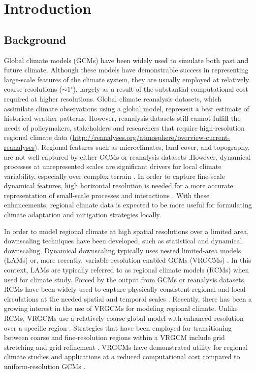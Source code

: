\chapter{Introduction}

\section{Background}

Global climate models (GCMs) have been widely used to simulate both past and future climate. Although these models have demonstrable success in representing large-scale features of the climate system, they are usually employed at relatively coarse resolutions ($\sim$1$^\circ$), largely as a result of the substantial computational cost required at higher resolutions. Global climate reanalysis datasets, which assimilate climate observations using a global model, represent a best estimate of historical weather patterns. However, reanalysis datasets still cannot fulfill the needs of policymakers, stakeholders and researchers that require high-resolution regional climate data (\url{http://reanalyses.org/atmosphere/overview-current-reanalyses}). Regional features such as microclimates, land cover, and topography, are not well captured by either GCMs or reanalysis datasets \cite{leung2003regional}.However, dynamical processes at unrepresented scales are significant drivers for local climate variability, especially over complex terrain \cite{soares2012wrf}. In order to capture fine-scale dynamical features, high horizontal resolution is needed for a more accurate representation of small-scale processes and interactions \cite{rauscher2010resolution}. With these enhancements, regional climate data is expected to be more useful for formulating climate adaptation and mitigation strategies locally.

In order to model regional climate at high spatial resolutions over a limited area, downscaling techniques have been developed, such as statistical and dynamical downscaling. Dynamical downscaling typically uses nested limited-area models (LAMs) or, more recently, variable-resolution enabled GCMs (VRGCMs) \cite{laprise2008regional}. In this context, LAMs are typically referred to as regional climate models (RCMs) when used for climate study. Forced by the output from GCMs or reanalysis datasets, RCMs have been widely used to capture physically consistent regional and local circulations at the needed spatial and temporal scales \cite{christensen2007regional, bukovsky2009precipitation, mearns2012north}. Recently, there has been a growing interest in the use of VRGCMs for modeling regional climate. Unlike RCMs, VRGCMs use a relatively coarse global model with enhanced resolution over a specific region \cite{staniforth1978variable, fox1997finite}.  Strategies that have been employed for transitioning between coarse and fine-resolution regions within a VRGCM include grid stretching \cite{fox1997finite, mcgregor2008updated} and grid refinement \cite{ringler2008multiresolution, skamarock2012multiscale, zarzycki2014aquaplanet}. VRGCMs have demonstrated utility for regional climate studies and applications at a reduced computational cost compared to uniform-resolution GCMs \cite{fox2006variable, rauscher2013exploring, zarzycki2015effects}. 

